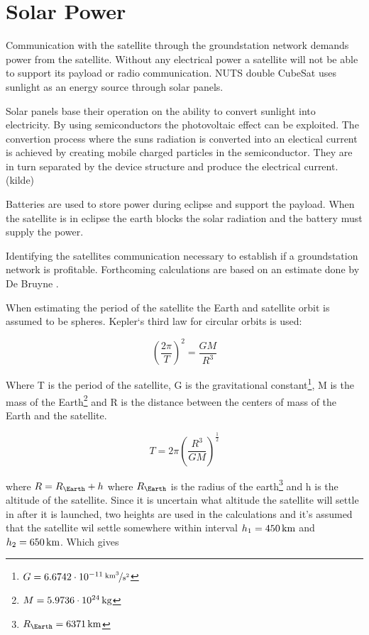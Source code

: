 \section{Solar Power}

Communication with the satellite through the groundstation network demands power from the satellite. Without any electrical power a satellite will not be able to support its payload or radio communication. NUTS double CubeSat uses sunlight as an energy source through solar panels. 

Solar panels base their operation on the ability to convert sunlight into electricity. By using semiconductors the photovoltaic effect can be exploited. The convertion process where the suns radiation is converted into an electical current is achieved by creating mobile charged particles in the semiconductor. They are in turn separated by the device structure and produce the electrical current.(kilde) 

Batteries are used to store power during eclipse and support the payload. When the satellite is in eclipse the earth blocks the solar radiation and the battery must supply the power.

Identifying the satellites communication necessary to establish if a groundstation network is profitable. Forthcoming calculations are based on an estimate done by De Bruyne \cite{Satellite Power Systems}.

When estimating the period of the satellite the Earth and satellite orbit is assumed to be spheres. Kepler`s third law for circular orbits is used:

\begin{equation}
\left(\frac{2\pi}{T}\right)^2 = \frac{GM}{R^3}
\label{eq:Keplers_3}
\end{equation}

Where T is the period of the satellite, G is the gravitational constant\footnote{$G=\unitfrac[6.6742\cdot 10^{-11}]{km^3}{s^2}$}, M is the mass of the Earth\footnote{$M=\unit[5.9736\cdot 10^{24}]{kg}$} and R is the distance between the centers of mass of the Earth and the satellite.

\begin{equation}
T = 2\pi \left(\frac{R^3}{GM}\right)^{\frac{1}{2}}
\label{eq:satellite_period}
\end{equation}

where $R = R_\Earth + h$ where $R_\Earth$ is the radius of the earth\footnote{$R_\Earth = \unit[6371]{km}$} and h is the altitude of the satellite. 
Since it is uncertain what altitude the satellite will settle in after it is launched, two heights are used in the calculations and it's assumed that the satellite wil settle somewhere within interval $h_1=\unit[450]{km}$ and $h_2=\unit[650]{km}$. 
Which gives

